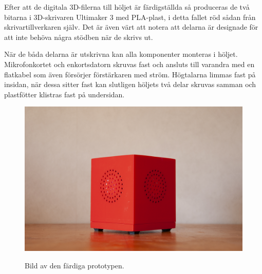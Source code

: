 Efter att de digitala 3D-filerna till höljet är färdigställda så produceras de två bitarna i 3D-skrivaren Ultimaker 3 med PLA-plast, i detta fallet röd sådan från skrivar\-tillverkaren själv. Det är även värt att notera att delarna är designade för att inte behöva några stödben när de skrivs ut.

När de båda delarna är utskrivna kan alla komponenter monteras i höljet. Mikrofon\-kortet och enkortsdatorn skruvas fast och ansluts till varandra med en flatkabel som även försörjer förstärkaren med ström. Högtalarna limmas fast på insidan, när dessa sitter fast kan slutligen höljets två delar skruvas samman och plastfötter klistras fast på undersidan.


\begin{figure}[H]
    \centering
    \caption{\small Bild av den färdiga prototypen.}
    \includegraphics[width=14cm]{bilder/final_unit_small.jpg}
    \label{fig:final_unit} 
\end{figure}

